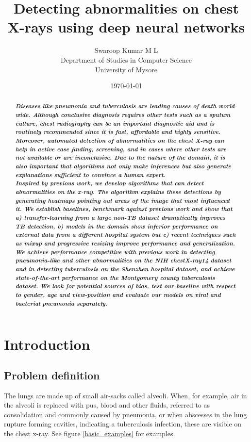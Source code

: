 \documentclass[12pt,oneside,a4paper]{report}
\title{Detecting abnormalities on chest X-rays using deep neural networks}
\author{
  Swaroop Kumar M L\\
  Department of Studies in Computer Science\\
  University of Mysore
}
\date{\today}
\begin{document}
\maketitle
\renewcommand\abstractname{\Large{\textbf{ABSTRACT}}}
\begin{abstract}
  \textbf{\textit{Diseases like pneumonia and tuberculosis are leading causes of
      death world-wide. Although conclusive diagnosis requires other tests such
      as a sputum culture, chest radiography can be an important diagnostic aid
      and is routinely recommended since it is fast, affordable and highly
      sensitive. Moreover, automated detection of abnormalities on the chest
      X-ray can help in active case finding, screening, and in cases where other
      tests are not available or are inconclusive. Due to the nature of the
      domain, it is also important that algorithms not only make inferences
      but also generate explanations sufficient to convince a human expert.}}\\

  \textbf{\textit{Inspired by previous work, we develop algorithms that can
      detect abnormalities on the x-ray. The algorithm explains these detections
      by generating heatmaps pointing out areas of the image that most
      influenced it. We establish baselines, benchmark against previous work and
      show that a) transfer-learning from a large non-TB dataset dramatically
      improves TB detection, b) models in the domain show inferior performance
      on external data from a different hospital system but c) recent techniques
      such as mixup and progressive resizing improve performance and
      generalization. We achieve performance competitive with previous work in
      detecting pneumonia-like and other abnormalities on the NIH chestX-ray14
      dataset and in detecting tuberculosis on the Shenzhen hospital dataset,
      and achieve state-of-the-art performance on the Montgomery county
      tuberculosis dataset. We look for potential sources of bias, test
      our baseline with respect to gender, age and view-position and evaluate
      our models on viral and bacterial pneumonia separately.}}
\end{abstract}
\tableofcontents
\listoftables
\listoffigures
\chapter{Introduction}
\section{Problem definition}
The lungs are made up of small air-sacks called alveoli. When, for example, air
in the alveoli is replaced with pus, blood and other fluids, referred to as
consolidation and commonly caused by pneumonia, or when abscesses in the lung
rupture forming cavities, indicating a tuberculosis infection, these are
visible on the chest x-ray. See figure \ref{basic_examples} for examples.\\
\end{document}
